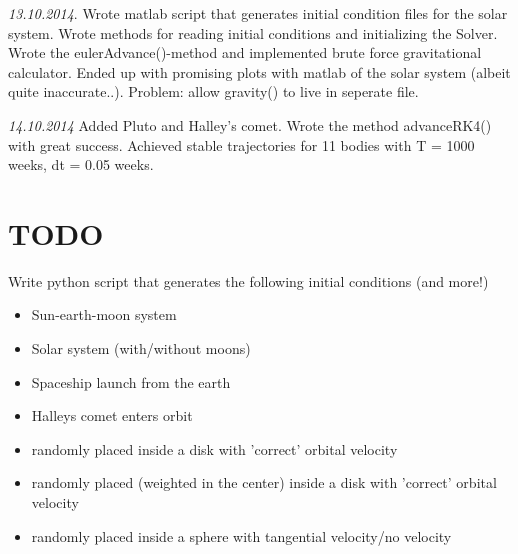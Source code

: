 \documentclass[11pt, oneside]{article}   	%
\begin{document}
\emph{13.10.2014}.
Wrote matlab script that generates initial condition files for the solar system. Wrote methods for reading initial conditions and initializing the Solver. Wrote the eulerAdvance()-method and implemented brute force gravitational calculator. Ended up with promising plots with matlab of the solar system (albeit quite inaccurate..). Problem: allow gravity() to live in seperate file. 

\emph{14.10.2014}
Added Pluto and Halley's comet. Wrote the method advanceRK4() with great success. Achieved stable trajectories for 11 bodies with T = 1000 weeks, dt = 0.05 weeks. 

\newpage

\section{TODO}

Write python script that generates the following initial conditions (and more!)
\begin{itemize}

\item Sun-earth-moon system
\item Solar system (with/without moons)
\item Spaceship launch from the earth
\item Halleys comet enters orbit

\item randomly placed inside a disk with 'correct' orbital velocity
\item randomly placed (weighted in the center) inside a disk with 'correct' orbital velocity
\item randomly placed inside a sphere with tangential velocity/no velocity

\end{itemize}
\end{document}
